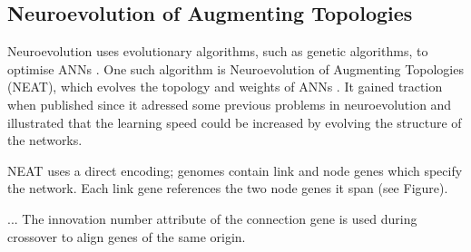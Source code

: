 \newpage

\subsection{Neuroevolution of Augmenting Topologies}
Neuroevolution uses evolutionary algorithms, such as genetic algorithms, to optimise ANNs \cite{neuroevolution_review}.
One such algorithm is Neuroevolution of Augmenting Topologies (NEAT), which evolves the topology and weights of ANNs \cite{neat_main}.
It gained traction when published since it adressed some previous problems in neuroevolution and illustrated that the learning speed could
be increased by evolving the structure of the networks.

NEAT uses a direct encoding; genomes contain link and node genes which specify the network. Each link gene references
the two node genes it span (see Figure).


\begin{figure}[htb]
    \resizebox{0.5\textwidth}{!}{}
\end{figure}
...
The innovation number attribute of the connection gene is used during crossover to align genes of the same origin.

\newline
{}
\newline
{}
\newline
{}

